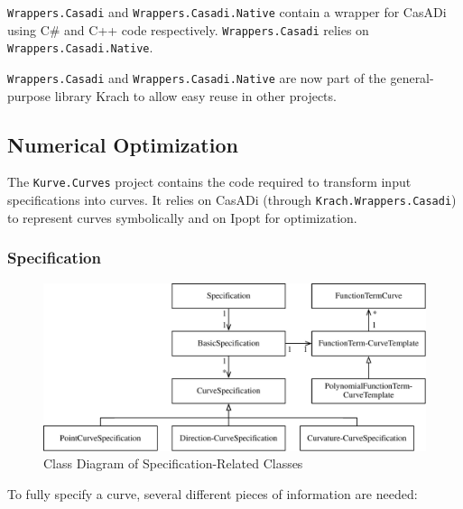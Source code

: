 \documentclass[a4paper]{article}
\begin{document}
				 \verb|Wrappers.Casadi| and \verb|Wrappers.Casadi.Native| contain a wrapper for CasADi using C\# and C++ code respectively. \verb|Wrappers.Casadi| relies on \verb|Wrappers.Casadi.Native|. 
				 
				 \verb|Wrappers.Casadi| and \verb|Wrappers.Casadi.Native| are now part of the general-purpose library Krach to allow easy reuse in other projects.
		
			\subsection{Numerical Optimization}
				The \verb|Kurve.Curves| project contains the code required to transform input specifications into curves. It relies on CasADi (through \verb|Krach.Wrappers.Casadi|) to represent curves symbolically and on Ipopt for optimization.
			
				\subsubsection{Specification}
					\begin{figure}[htb]
						\centering
						\includegraphics[width=135mm]{content/output/specification_class_diagram.pdf}
						\caption{Class Diagram of Specification-Related Classes}
						\label{figure:specification_class_diagram}
					\end{figure}
				
					To fully specify a curve, several different pieces of information are needed:
				
\end{document}
